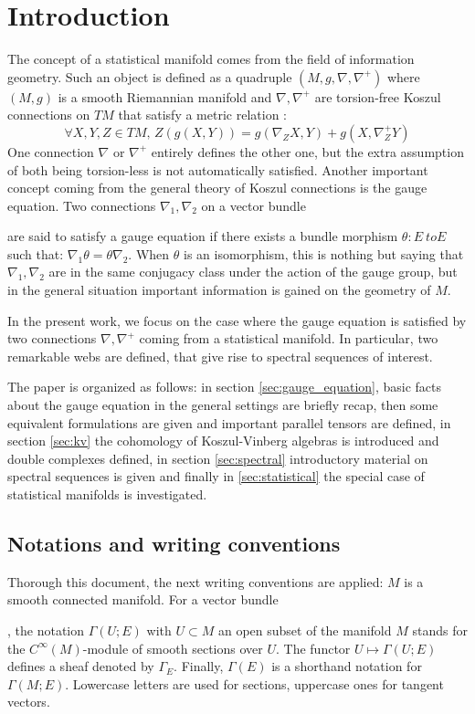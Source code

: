 \section{Introduction}
The concept of a statistical manifold comes from the field of information geometry. Such an object is defined as a quadruple $\left(
M, g, \nabla, \nabla^+\right)$ where $(M,g)$ is a smooth Riemannian manifold and $\nabla, \nabla^+$ are torsion-free Koszul connections on $TM$ that satisfy a metric relation \citep{amari2016information}:
\[
\forall X,Y,Z \in TM, \, Z\left(g(X,Y)\right) = 
g\left(\nabla_Z X, Y \right) +g \left(X, \nabla^+_Z Y \right)
\]
One connection $\nabla$ or $\nabla^+$ entirely defines the other one, but the extra assumption of both being torsion-less is not automatically satisfied. Another important concept coming from the general theory of Koszul connections is the gauge equation. Two connections $\nabla_1,\nabla_2$ on a vector bundle  are said to satisfy a gauge equation if there exists a bundle morphism $\theta \colon E \ to E$ such that: $\nabla_1 \theta = \theta \nabla_2.$ When $\theta$ is an isomorphism, this is nothing but saying that $\nabla_1, \nabla_2$ are in the same conjugacy class under the action of the gauge group, but in the general situation important information is gained on the geometry of $M.$

In the present work, we focus on the case where the gauge equation is satisfied by two connections $\nabla,\nabla^+$ coming from a statistical manifold. In particular, two remarkable webs are defined, that give rise to spectral sequences of interest.

The paper is organized as follows: in section \ref{sec:gauge_equation}, basic facts about the gauge equation in the general settings are briefly recap, then some equivalent formulations are given and important parallel tensors are defined, in section \ref{sec:kv} the cohomology of Koszul-Vinberg algebras is introduced and double complexes defined, in section \ref{sec:spectral} introductory material on spectral sequences is given and finally in \ref{sec:statistical} the special case of statistical manifolds is investigated.
\subsection{Notations and writing conventions}
Thorough this document, the next writing conventions are applied:
$M$ is a smooth connected manifold. For a vector bundle  , the notation $\Gamma(U;E)$ with $U \subset M$ an open subset
of the manifold $M$ stands for the $C^\infty(M)$-module of smooth sections over
$U$. The functor $U \mapsto \Gamma(U;E)$ defines a sheaf denoted by $\Gamma_E$. Finally,
$\Gamma(E)$ is a shorthand notation for $\Gamma(M;E).$ Lowercase letters are used for sections,
uppercase ones for tangent vectors.